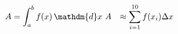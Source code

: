 \documentclass[preview]{standalone}
\begin{document}
\begin{align*}
A &= \int_{a}^{b} f(x) \, \mathdm{d} x \ A &\approx \sum_{i=1}^{10}f(x_i)\Delta x
\end{align*}
\end{document}
